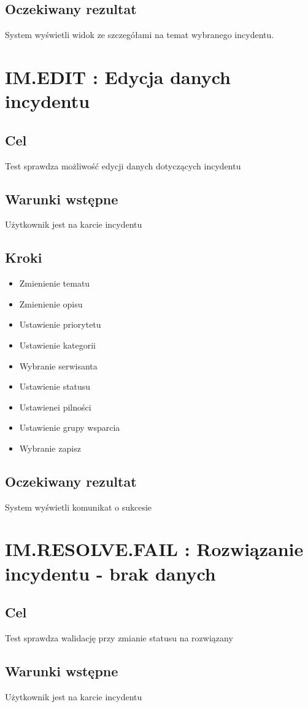 \documentclass[a4paper, oneside, 11pt]{report}
\begin{document}
\subsection*{Oczekiwany rezultat}
System wyświetli widok ze szczegółami na temat wybranego incydentu.

\section{IM.EDIT : Edycja danych incydentu}
\subsection*{Cel}
Test sprawdza możliwość edycji danych dotyczących incydentu
\subsection*{Warunki wstępne}
Użytkownik jest na karcie incydentu
\subsection*{Kroki}
\begin{itemize}
	\item Zmienienie tematu
	\item Zmienienie opisu
	\item Ustawienie priorytetu
	\item Ustawienie kategorii
	\item Wybranie serwisanta
	\item Ustawienie statusu
	\item Ustawienei pilności
	\item Ustawienie grupy wsparcia
	\item Wybranie zapisz
\end{itemize}
\subsection*{Oczekiwany rezultat}
System wyświetli komunikat o sukcesie

\section{IM.RESOLVE.FAIL : Rozwiązanie incydentu - brak danych}
\subsection*{Cel}
Test sprawdza walidację przy zmianie statusu na rozwiązany
\subsection*{Warunki wstępne}
Użytkownik jest na karcie incydentu
\end{document}
